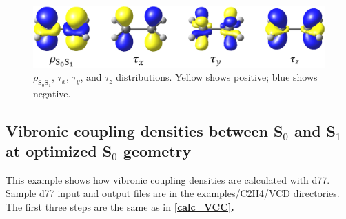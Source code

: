 ﻿\documentclass[11pt,a4paper,openany]{article}
\begin{document}
\begin{figure}[h]
\centering
\includegraphics[width=15cm]{tdmd.eps}
\caption{
$\rho_{\mathrm{S}_0\mathrm{S}_1}$, $\tau_x$, $\tau_y$, and $\tau_z$ distributions.
Yellow shows positive; blue shows negative.
}
\label{fig:tdmd}
\end{figure}

\clearpage
\subsection{Vibronic coupling densities between S$_0$ and S$_1$ at optimized S$_0$ geometry}
This example shows how vibronic coupling densities are calculated with d77. 
Sample d77 input and output files are in the examples/C2H4/VCD directories. The first three steps are the same as in \bf{\ref{calc_VCC}}\rm{.}
\end{document}
